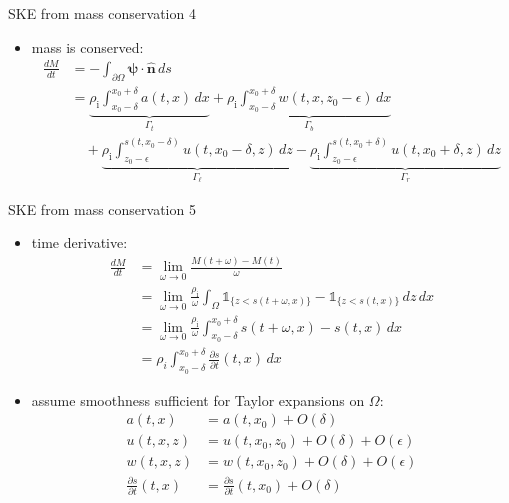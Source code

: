 \documentclass[10pt,dvipsnames]{beamer}
\newcommand{\hbn}{\hat{\mathbf{n}}}
\newcommand{\bpsi}{\bm{\psi}}
\newcommand{\eps}{\epsilon}
\newcommand{\rhoi}{\rho_{\text{i}}}
\begin{document}
\begin{frame}{SKE from mass conservation 4}

\begin{itemize}
\item mass is conserved:
\begin{align*}
\frac{dM}{dt} &= - \int_{\partial \Omega} \bpsi \cdot \hbn\,ds \\
  &= \underbrace{\rhoi \int_{x_0-\delta}^{x_0+\delta} a(t,x)\,dx}_{\Gamma_t} + \underbrace{\rhoi \int_{x_0-\delta}^{x_0+\delta} w(t,x,z_0-\eps)\,dx}_{\Gamma_b} \\
  &\quad + \underbrace{\rhoi \int_{z_0-\eps}^{s(t,x_0-\delta)} u(t,x_0-\delta,z)\,dz}_{\Gamma_\ell} - \underbrace{\rhoi \int_{z_0-\eps}^{s(t,x_0+\delta)} u(t,x_0+\delta,z)\,dz}_{\Gamma_r}
\end{align*}

\end{itemize}
\end{frame}

\begin{frame}{SKE from mass conservation 5}

\begin{itemize}
\item time derivative:
\begin{align*}
\frac{dM}{dt} &= \lim_{\omega\to 0} \frac{M(t+\omega) - M(t)}{\omega} \\
    &= \lim_{\omega\to 0} \frac{\rhoi}{\omega} \int_\Omega \mathbb{1}_{\{z<s(t+\omega,x)\}} - \mathbb{1}_{\{z<s(t,x)\}}\,dz\,dx \\
    &= \lim_{\omega\to 0} \frac{\rhoi}{\omega} \int_{x_0-\delta}^{x_0+\delta} s(t+\omega,x) - s(t,x)\,dx \\
    &= \rho_i \int_{x_0-\delta}^{x_0+\delta} \frac{\partial s}{\partial t}(t,x)\,dx
\end{align*}
\item assume smoothness sufficient for Taylor expansions on $\Omega$:
\begin{align*}
a(t,x) &= a(t,x_0) + O(\delta) \\
u(t,x,z) &= u(t,x_0,z_0) + O(\delta) + O(\eps) \\
w(t,x,z) &= w(t,x_0,z_0) + O(\delta) + O(\eps) \\
\frac{\partial s}{\partial t}(t,x) &= \frac{\partial s}{\partial t}(t,x_0) + O(\delta)
\end{align*}
\end{itemize}
\end{frame}
\end{document}
